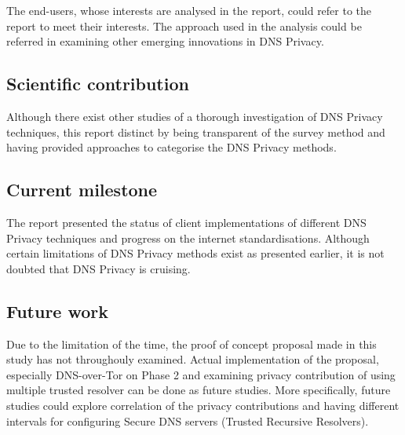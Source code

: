 \documentclass[a4paper,12pt]{article}
\begin{document}
The end-users, whose interests are analysed in the report, could refer to the report to meet their interests.
The approach used in the analysis could be referred in examining other emerging innovations in DNS Privacy. 

\subsection{Scientific contribution}
Although there exist other studies of a thorough investigation of DNS Privacy techniques, this report distinct by being transparent of the survey method and having provided approaches to categorise the DNS Privacy methods.

\subsection{Current milestone}
The report presented the status of client implementations of different DNS Privacy techniques and progress on the internet standardisations.
Although certain limitations of DNS Privacy methods exist as presented earlier, it is not doubted that DNS Privacy is cruising.

\subsection{Future work}
Due to the limitation of the time, the proof of concept proposal made in this study has not throughouly examined.
Actual implementation of the proposal, especially DNS-over-Tor on Phase 2 and examining privacy contribution of using multiple trusted resolver can be done as future studies.
More specifically, future studies could explore correlation of the privacy contributions and having different intervals for configuring Secure DNS servers (Trusted Recursive Resolvers).
\newpage


%
\newpage

\hypersetup{urlcolor=black}


\newpage
\setcounter{page}{1} %
\appendix
\end{document}
